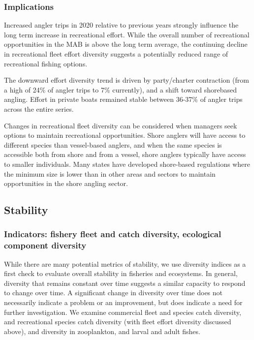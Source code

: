 \documentclass[
  10pt,
]{article}
\begin{document}
\hypertarget{implications-2}{%
\subsubsection{Implications}\label{implications-2}}

Increased angler trips in 2020 relative to previous years strongly
influence the long term increase in recreational effort. While the
overall number of recreational opportunities in the MAB is above the
long term average, the continuing decline in recreational fleet effort
diversity suggests a potentially reduced range of recreational fishing
options.

The downward effort diversity trend is driven by party/charter
contraction (from a high of 24\% of angler trips to 7\% currently), and
a shift toward shorebased angling. Effort in private boats remained
stable between 36-37\% of angler trips across the entire series.

Changes in recreational fleet diversity can be considered when managers
seek options to maintain recreational opportunities. Shore anglers will
have access to different species than vessel-based anglers, and when the
same species is accessible both from shore and from a vessel, shore
anglers typically have access to smaller individuals. Many states have
developed shore-based regulations where the minimum size is lower than
in other areas and sectors to maintain opportunities in the shore
angling sector.

\hypertarget{stability}{%
\subsection{Stability}\label{stability}}

\hypertarget{indicators-fishery-fleet-and-catch-diversity-ecological-component-diversity}{%
\subsubsection{Indicators: fishery fleet and catch diversity, ecological
component
diversity}\label{indicators-fishery-fleet-and-catch-diversity-ecological-component-diversity}}

While there are many potential metrics of stability, we use diversity
indices as a first check to evaluate overall stability in fisheries and
ecosystems. In general, diversity that remains constant over time
suggests a similar capacity to respond to change over time. A
significant change in diversity over time does not necessarily indicate
a problem or an improvement, but does indicate a need for further
investigation. We examine commercial fleet and species catch diversity,
and recreational species catch diversity (with fleet effort diversity
discussed above), and diversity in zooplankton, and larval and adult
fishes.
\end{document}
